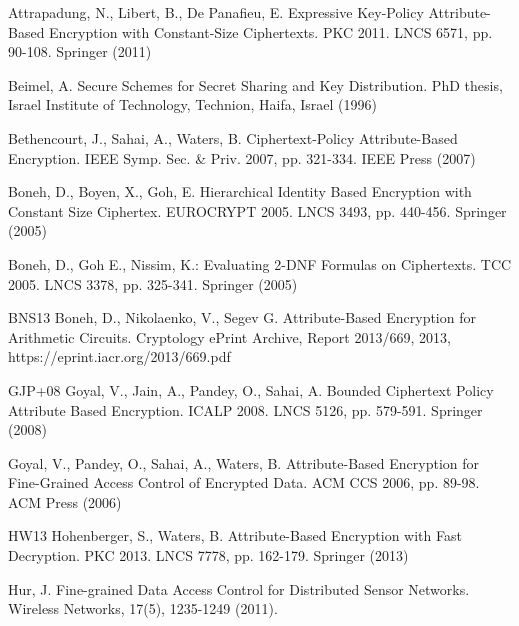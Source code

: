 \documentclass[twocolumn]{svjour3}          \smartqed  \usepackage{graphicx}
\begin{document}
\begin{figure}
\label{fig:1}       \end{figure}
\begin{figure*}
\label{fig:2}       \end{figure*}








\begin{thebibliography}{11}




 Attrapadung, N., Libert, B., De Panafieu, E. Expressive Key-Policy Attribute-Based Encryption with Constant-Size Ciphertexts. PKC 2011. LNCS 6571, pp. 90-108. Springer (2011)

 Beimel, A. Secure Schemes for Secret Sharing and Key Distribution. PhD thesis, Israel Institute of Technology, Technion, Haifa, Israel (1996)

 Bethencourt, J., Sahai, A., Waters, B. Ciphertext-Policy Attribute-Based Encryption.  IEEE Symp. Sec. \& Priv. 2007, pp.
321-334. IEEE Press (2007)



 Boneh, D., Boyen, X., Goh, E. Hierarchical Identity Based Encryption with Constant Size Ciphertex.  EUROCRYPT 2005. 
LNCS 3493, pp. 440-456. Springer (2005)



 Boneh, D., Goh E., Nissim, K.: Evaluating 2-DNF Formulas on Ciphertexts.  TCC 2005. LNCS 3378, pp. 325-341. Springer (2005)

\bibitem
{BNS13} Boneh, D., Nikolaenko, V.,  Segev G. Attribute-Based Encryption for Arithmetic Circuits. Cryptology ePrint Archive, Report 2013/669, 2013, https://eprint.iacr.org/2013/669.pdf



\bibitem
{GJP+08} Goyal, V., Jain, A., Pandey, O., Sahai, A. Bounded Ciphertext Policy Attribute Based Encryption. ICALP 2008. LNCS 5126, pp. 579-591. Springer (2008)

 Goyal, V., Pandey, O., Sahai, A., Waters, B. Attribute-Based Encryption for Fine-Grained Access Control of Encrypted Data.  ACM CCS 2006, pp. 89-98. ACM Press (2006)

\bibitem
{HW13} Hohenberger, S., Waters, B. Attribute-Based Encryption with Fast Decryption. PKC 2013. LNCS 7778,
pp. 162-179. Springer (2013)

Hur, J. Fine-grained Data Access Control for Distributed Sensor Networks. Wireless Networks, 17(5), 1235-1249 (2011).




\end{thebibliography}
\end{document}
